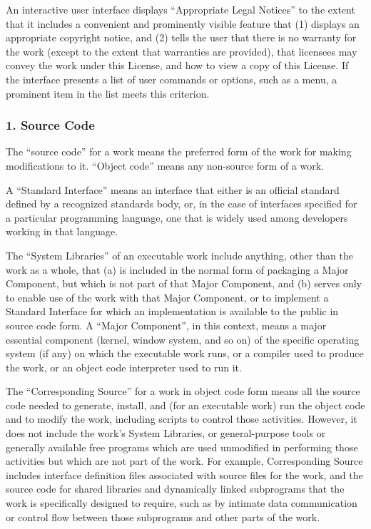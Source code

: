 \documentclass[a4paper, 11pt, twoside]{article}
\begin{document}
An interactive user interface displays “Appropriate Legal Notices” to the extent that it includes a convenient and prominently visible feature that (1) displays an appropriate copyright notice, and (2) tells the user that there is no warranty for the work (except to the extent that warranties are provided), that licensees may convey the work under this License, and how to view a copy of this License. If the interface presents a list of user commands or options, such as a menu, a prominent item in the list meets this criterion.

\subsubsection{1. Source Code}

The “source code” for a work means the preferred form of the work for making modifications to it. “Object code” means any non-source form of a work.

A “Standard Interface” means an interface that either is an official standard defined by a recognized standards body, or, in the case of interfaces specified for a particular programming language, one that is widely used among developers working in that language.

The “System Libraries” of an executable work include anything, other than the work as a whole, that (a) is included in the normal form of packaging a Major Component, but which is not part of that Major Component, and (b) serves only to enable use of the work with that Major Component, or to implement a Standard Interface for which an implementation is available to the public in source code form. A “Major Component”, in this context, means a major essential component (kernel, window system, and so on) of the specific operating system (if any) on which the executable work runs, or a compiler used to produce the work, or an object code interpreter used to run it.

The “Corresponding Source” for a work in object code form means all the source code needed to generate, install, and (for an executable work) run the object code and to modify the work, including scripts to control those activities. However, it does not include the work's System Libraries, or general-purpose tools or generally available free programs which are used unmodified in performing those activities but which are not part of the work. For example, Corresponding Source includes interface definition files associated with source files for the work, and the source code for shared libraries and dynamically linked subprograms that the work is specifically designed to require, such as by intimate data communication or control flow between those subprograms and other parts of the work.
\end{document}
